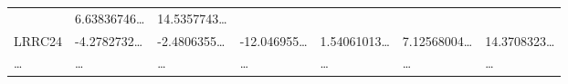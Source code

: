 \documentclass[
]{article}
\begin{document}
\begin{longtable}[]{@{}lllllll@{}}
\begin{minipage}[t]{0.12\columnwidth}
\end{minipage} & \begin{minipage}[t]{0.12\columnwidth}\raggedright
6.63836746\ldots{}\strut
\end{minipage} & \begin{minipage}[t]{0.12\columnwidth}\raggedright
14.5357743\ldots{}\strut
\end{minipage}\tabularnewline
\begin{minipage}[t]{0.08\columnwidth}\raggedright
LRRC24\strut
\end{minipage} & \begin{minipage}[t]{0.12\columnwidth}\raggedright
-4.2782732\ldots{}\strut
\end{minipage} & \begin{minipage}[t]{0.12\columnwidth}\raggedright
-2.4806355\ldots{}\strut
\end{minipage} & \begin{minipage}[t]{0.12\columnwidth}\raggedright
-12.046955\ldots{}\strut
\end{minipage} & \begin{minipage}[t]{0.12\columnwidth}\raggedright
1.54061013\ldots{}\strut
\end{minipage} & \begin{minipage}[t]{0.12\columnwidth}\raggedright
7.12568004\ldots{}\strut
\end{minipage} & \begin{minipage}[t]{0.12\columnwidth}\raggedright
14.3708323\ldots{}\strut
\end{minipage}\tabularnewline
\begin{minipage}[t]{0.08\columnwidth}\raggedright
\ldots{}\strut
\end{minipage} & \begin{minipage}[t]{0.12\columnwidth}\raggedright
\ldots{}\strut
\end{minipage} & \begin{minipage}[t]{0.12\columnwidth}\raggedright
\ldots{}\strut
\end{minipage} & \begin{minipage}[t]{0.12\columnwidth}\raggedright
\ldots{}\strut
\end{minipage} & \begin{minipage}[t]{0.12\columnwidth}\raggedright
\ldots{}\strut
\end{minipage} & \begin{minipage}[t]{0.12\columnwidth}\raggedright
\ldots{}\strut
\end{minipage} & \begin{minipage}[t]{0.12\columnwidth}\raggedright
\ldots{}\strut
\end{minipage}\tabularnewline
\bottomrule
\end{longtable}
\end{document}

